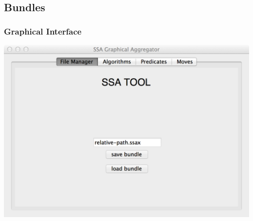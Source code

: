 \documentclass{beamer}
\begin{document}
\subsection{Bundles}
\begin{frame}
  \frametitle{Graphical Interface}
  \centering
  \includegraphics[width=\textwidth]{../figs/3-2}
\end{frame}
\end{document}
